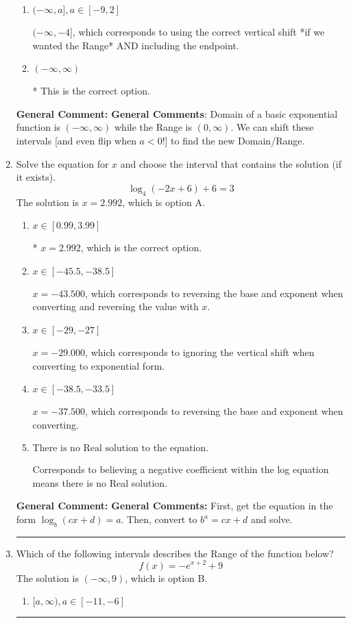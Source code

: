 \documentclass{extbook}[14pt]
\newcommand{\litem}[1]{\item #1

\rule{\textwidth}{0.4pt}}
\begin{document}
\begin{enumerate}
{\begin{enumerate}[label=\Alph*.]
$(4, \infty)$, which corresponds to using the negative vertical shift AND flipping the Range interval.
\item \( (-\infty, a], a \in [-9, 2] \)

$(-\infty, -4]$, which corresponds to using the correct vertical shift *if we wanted the Range* AND including the endpoint.
\item \( (-\infty, \infty) \)

* This is the correct option.
\end{enumerate}

\textbf{General Comment:} \textbf{General Comments}: Domain of a basic exponential function is $(-\infty, \infty)$ while the Range is $(0, \infty)$. We can shift these intervals [and even flip when $a<0$!] to find the new Domain/Range.
}
\litem{
Solve the equation for $x$ and choose the interval that contains the solution (if it exists).
\[ \log_{4}{(-2x+6)}+6 = 3 \]The solution is \( x = 2.992 \), which is option A.\begin{enumerate}[label=\Alph*.]
\item \( x \in [0.99, 3.99] \)

* $x = 2.992$, which is the correct option.
\item \( x \in [-45.5, -38.5] \)

$x = -43.500$, which corresponds to reversing the base and exponent when converting and reversing the value with $x$.
\item \( x \in [-29, -27] \)

$x = -29.000$, which corresponds to ignoring the vertical shift when converting to exponential form.
\item \( x \in [-38.5, -33.5] \)

$x = -37.500$, which corresponds to reversing the base and exponent when converting.
\item \( \text{There is no Real solution to the equation.} \)

Corresponds to believing a negative coefficient within the log equation means there is no Real solution.
\end{enumerate}

\textbf{General Comment:} \textbf{General Comments:} First, get the equation in the form $\log_b{(cx+d)} = a$. Then, convert to $b^a = cx+d$ and solve.
}
\litem{
Which of the following intervals describes the Range of the function below?
\[ f(x) = -e^{x+2}+9 \]The solution is \( (-\infty, 9) \), which is option B.\begin{enumerate}[label=\Alph*.]
\item \( [a, \infty), a \in [-11, -6] \)


\end{enumerate}}
\end{enumerate}
\end{document}
